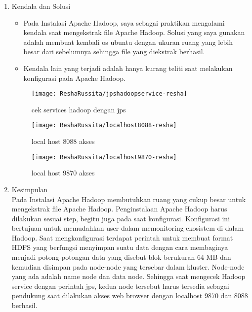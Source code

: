 
\begin{enumerate}
\item Kendala dan Solusi
\begin{itemize}
\item Pada Instalasi Apache Hadoop, saya sebagai praktikan mengalami kendala saat mengekstrak file Apache Hadoop. Solusi yang saya gunakan adalah membuat kembali os ubuntu dengan ukuran ruang yang lebih besar dari sebelumnya sehingga file yang diekstrak berhasil.
\item Kendala lain yang terjadi adalah hanya kurang teliti saat melakukan konfigurasi pada Apache Hadoop.
\end{itemize}

\begin{figure}[!ht]
\texttt{[image: ReshaRussita/jpshadoopservice-resha]}
\caption{cek services hadoop dengan jps}
\label{gam:perkuliahan-22-09}
\end{figure}

\begin{figure}[!ht]
\texttt{[image: ReshaRussita/localhost8088-resha]}
\caption{local host 8088 akses}
\label{gam:perkuliahan-22-09}
\end{figure}

\begin{figure}[!ht]
\texttt{[image: ReshaRussita/localhost9870-resha]}
\caption{local host 9870 akses}
\label{gam:perkuliahan-22-09}
\end{figure}

\item Kesimpulan \\
Pada Instalasi Apache Hadoop membutuhkan ruang yang cukup besar untuk mengekstrak file Apache Hadoop. Penginstalaan Apache Hadoop harus dilakukan sesuai step, begitu juga pada saat konfigurasi. Konfigurasi ini bertujuan untuk memudahkan user dalam memonitoring ekosistem di dalam Hadoop. Saat mengkonfigurasi terdapat perintah untuk membuat format HDFS yang berfungsi menyimpan suatu data dengan cara membaginya menjadi potong-potongan data yang disebut blok berukuran 64 MB dan kemudian disimpan pada node-node yang tersebar dalam kluster. Node-node yang ada adalah name node dan data node. Sehingga saat mengecek Hadoop service dengan perintah jps, kedua node tersebut harus tersedia sebagai pendukung saat dilakukan akses web browser dengan localhost 9870 dan 8088 berhasil.
\end{enumerate}


